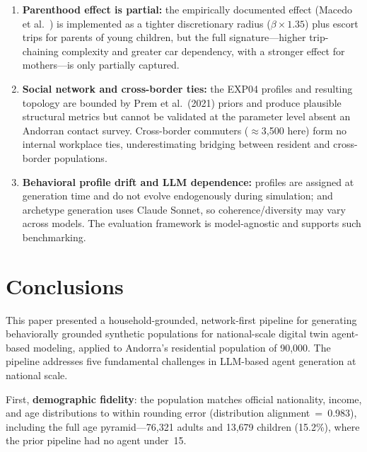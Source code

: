 \documentclass[a4paper,12pt]{article}
\begin{document}
\begin{enumerate}
      agent. Weekend patterns, seasonal variation (ski vs.\ summer), and Andorra's
      $\approx$100:1 visitor/resident tourist-flow interactions are collapsed into a
      single weekday and use HETUS 2010 European base rates as a proxy.
\item \textbf{Parenthood effect is partial:} the empirically documented effect
      (Macedo et al.~\cite{macedo2026parenthood}) is implemented as a tighter
      discretionary radius ($\beta\times1.35$) plus escort trips for parents of young
      children, but the full signature---higher trip-chaining complexity and greater
      car dependency, with a stronger effect for mothers---is only partially captured.
\item \textbf{Social network and cross-border ties:} the EXP04 profiles and resulting
      topology are bounded by Prem et al.\ (2021) priors and produce plausible
      structural metrics but cannot be validated at the parameter level absent an
      Andorran contact survey. Cross-border commuters ($\approx$3{,}500 here) form no
      internal workplace ties, underestimating bridging between resident and
      cross-border populations.
\item \textbf{Behavioral profile drift and LLM dependence:} profiles are assigned at
      generation time and do not evolve endogenously during simulation; and archetype
      generation uses Claude Sonnet, so coherence/diversity may vary across models. The
      evaluation framework is model-agnostic and supports such benchmarking.
\end{enumerate}

\section{Conclusions}
\label{sec:conclusions}

This paper presented a household-grounded, network-first pipeline for generating
behaviorally grounded synthetic populations for national-scale digital twin
agent-based modeling, applied to Andorra's residential population of 90,000. The
pipeline addresses five fundamental challenges in LLM-based agent generation
at national scale.

First, \textbf{demographic fidelity}: the population matches official nationality,
income, and age distributions to within rounding error (distribution alignment~=~0.983),
including the full age pyramid---76{,}321 adults and 13{,}679 children (15.2\%), where
the prior pipeline had no agent under~15.
\end{document}

